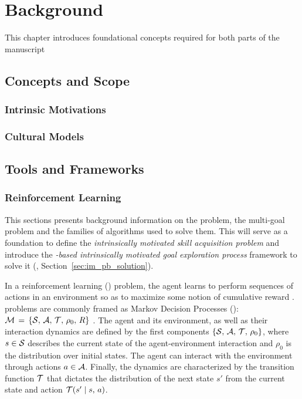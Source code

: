 \chapter{Background}
\adjustmtc
\minitoc

This chapter introduces foundational concepts required for both parts of the manuscript

\section{Concepts and Scope}
\subsection{Intrinsic Motivations}
\subsection{Cultural Models}

\section{Tools and Frameworks}
\subsection{Reinforcement Learning}

\label{sec:background}
This sections presents background information on the \rl problem, the multi-goal \rl problem and the families of algorithms used to solve them. This will serve as a foundation to define the \textit{intrinsically motivated skill acquisition problem} and introduce the  \textit{\textsl{\rl}-based intrinsically motivated goal exploration process} framework to solve it (\rlimgep, Section~\ref{sec:im_pb_solution}).

In a reinforcement learning (\rl) problem, the agent learns to perform sequences of actions in an environment so as to maximize some notion of cumulative reward \cite{sutton2018reinforcement}. \rl problems are commonly framed as Markov Decision Processes (\mdps): $\mathcal{M}\,=\,\{\mathcal{S},\,\mathcal{A},\,\mathcal{T},\,\rho_0,\,R\}$ \cite{sutton2018reinforcement}. The agent and its environment, as well as their interaction dynamics are defined by the first components $\{\mathcal{S},\,\mathcal{A},\,\mathcal{T},\,\rho_0\}$, where $s\in\mathcal{S}$ describes the current state of the agent-environment interaction and $\rho_0$ is the distribution over initial states. The agent can interact with the environment through actions $a\in\mathcal{A}$. Finally, the dynamics are characterized by the transition function $\mathcal{T}$ that dictates the distribution of the next state $s'$ from the current state and action $\mathcal{T} (s'\mid s,\,a)$. 


